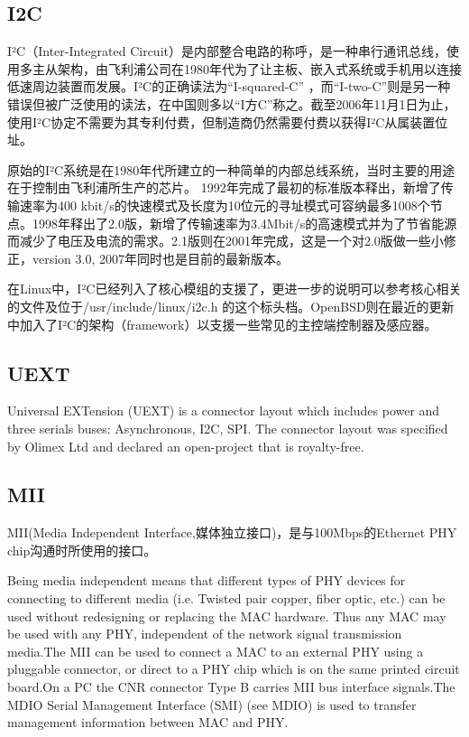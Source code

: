 \subsection{I2C}
I²C（Inter-Integrated Circuit）是内部整合电路的称呼，是一种串行通讯总线，使用多主从架构，由飞利浦公司在1980年代为了让主板、嵌入式系统或手机用以连接低速周边装置而发展。I²C的正确读法为``I-squared-C'' ，而``I-two-C''则是另一种错误但被广泛使用的读法，在中国则多以``I方C''称之。截至2006年11月1日为止，使用I²C协定不需要为其专利付费，但制造商仍然需要付费以获得I²C从属装置位址。


原始的I²C系统是在1980年代所建立的一种简单的内部总线系统，当时主要的用途在于控制由飞利浦所生产的芯片。
1992年完成了最初的标准版本释出，新增了传输速率为400 kbit/s的快速模式及长度为10位元的寻址模式可容纳最多1008个节点。1998年释出了2.0版，新增了传输速率为3.4Mbit/s的高速模式并为了节省能源而减少了电压及电流的需求。2.1版则在2001年完成，这是一个对2.0版做一些小修正，version 3.0, 2007年同时也是目前的最新版本。

在Linux中，I²C已经列入了核心模组的支援了，更进一步的说明可以参考核心相关的文件及位于/usr/include/linux/i2c.h 的这个标头档。OpenBSD则在最近的更新中加入了I²C的架构（framework）以支援一些常见的主控端控制器及感应器。

\subsection{UEXT}
Universal EXTension (UEXT) is a connector layout which includes power and three serials buses: Asynchronous, I2C, SPI. The connector layout was specified by Olimex Ltd and declared an open-project that is royalty-free.

\subsection{MII}
MII(Media Independent Interface,媒体独立接口)，是与100Mbps的Ethernet PHY chip沟通时所使用的接口。

Being media independent means that different types of PHY devices for connecting to different media (i.e. Twisted pair copper, fiber optic, etc.) can be used without redesigning or replacing the MAC hardware. Thus any MAC may be used with any PHY, independent of the network signal transmission media.The MII can be used to connect a MAC to an external PHY using a pluggable connector, or direct to a PHY chip which is on the same printed circuit board.On a PC the CNR connector Type B carries MII bus interface signals.The MDIO Serial Management Interface (SMI) (see MDIO) is used to transfer management information between MAC and PHY.

